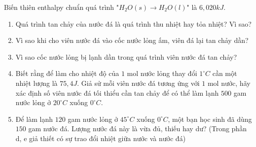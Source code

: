 \documentclass[Main.tex]{subfiles}
\begin{document}
	\begin{bt}[][CD - SBT] Biến thiên enthalpy chuẩn quá trình "$H_2O(s) \longrightarrow H_2O(l)$" là $6{,}020kJ$.
		\begin{enumerate}
			\item[(a)] Quá trình tan chảy của nước đá là quá trình thu nhiệt hay tỏa nhiệt? Vì sao?
			\item[(b)] Vì sao khi cho viên nước đá vào cốc nước lỏng ấm, viên đá lại tan chảy dần?
			\item[(c)] Vì sao cốc nước lỏng bị lạnh dần trong quá trình viên nước đá tan chảy?
			\item[(d)] Biết rằng để làm cho nhiệt độ của $1$ mol nước lỏng thay đổi $1^\circ C$ cần một nhiệt lượng là $75{,}4J$. Giả sử mỗi viên nước đá tương ứng với $1$ mol nước, hãy xác định số viên nước đá tối thiểu cần tan chảy để có thể làm lạnh $500$ gam nước lỏng ở $20^\circ C$ xuống $0^\circ C$.
			\item[(e)] Để làm lạnh $120$ gam nước lỏng ở $45^\circ C$ xuống $0^\circ C$, một bạn học sinh đã dùng $150$ gam nước đá. Lượng nước đá này là vừa đủ, thiếu hay dư? (Trong phần d, e giả thiết có sự trao đổi nhiệt giữa nước và nước đá)
		\end{enumerate}
	\end{bt}
\end{document}
